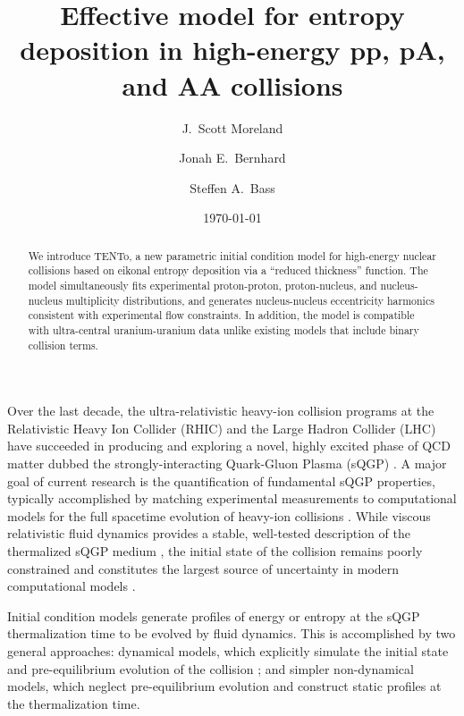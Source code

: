 \documentclass[aps,prc,reprint,amsmath]{revtex4-1}
\newcommand{\psec}[1]{\phantomsection\addcontentsline{toc}{section}{#1}}
\newcommand{\trento}{T\raisebox{-.5ex}{R}ENTo}
\begin{document}
\title{Effective model for entropy deposition in high-energy pp, pA, and AA collisions}

\author{J.\ Scott Moreland}
\author{Jonah E.\ Bernhard}
\author{Steffen A.\ Bass}

\date{\today}


\begin{abstract}
  We introduce \trento, a new parametric initial condition model for high-energy nuclear collisions based on eikonal entropy deposition via a ``reduced thickness'' function.
  The model simultaneously fits experimental proton-proton, proton-nucleus, and nucleus-nucleus multiplicity distributions, and generates nucleus-nucleus eccentricity harmonics consistent with experimental flow constraints.
  In addition, the model is compatible with ultra-central uranium-uranium data unlike existing models that include binary collision terms.
\end{abstract}


\maketitle

\psec{Introduction}

Over the last decade, the ultra-relativistic heavy-ion collision programs at the Relativistic Heavy Ion Collider (RHIC) and the Large Hadron Collider (LHC) have succeeded in producing and exploring a novel, highly excited phase of QCD matter dubbed the strongly-interacting Quark-Gluon Plasma (sQGP)
\cite{Arsene:2004fa,Adcox:2004mh,Back:2004je,Adams:2005dq,Gyulassy:2004zy,Muller:2006ee,Muller:2012zq}.
A major goal of current research is the quantification of fundamental sQGP properties, typically accomplished by matching experimental measurements to computational models for the full spacetime evolution of heavy-ion collisions \cite{Petersen:2010zt,Novak:2013bqa}.
While viscous relativistic fluid dynamics provides a stable, well-tested description of the thermalized sQGP medium \cite{Baier:2006gy,Song:2007ux,Luzum:2008cw,Schenke:2010rr,Shen:2011eg,Shen:2014vra}, the initial state of the collision remains poorly constrained and constitutes the largest source of uncertainty in modern computational models \cite{Song:2010mg, Retinskaya:2013gca}.

Initial condition models generate profiles of energy or entropy at the sQGP thermalization time to be evolved by fluid dynamics.
This is accomplished by two general approaches:
dynamical models, which explicitly simulate the initial state and pre-equilibrium evolution of the collision \cite{Schenke:2012wb,vanderSchee:2013pia,Berges:2014yta,Kurkela:2014tea};
and simpler non-dynamical models, which neglect pre-equilibrium evolution and construct static profiles at the thermalization time.
\end{document}

